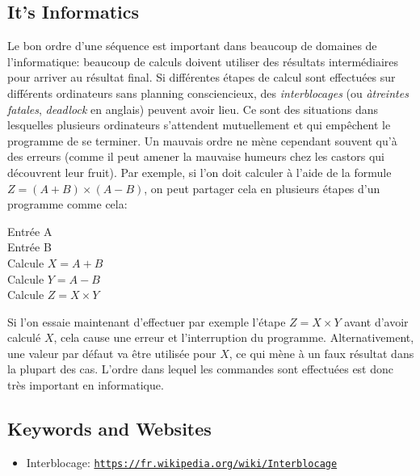 \documentclass[a4paper,11pt]{report}
\makeatletter
\renewenvironment{adjustwidth}[2]{%
    \begin{list}{}{%
    \partopsep\z@%
    \topsep\z@%
    \listparindent\parindent%
    \parsep\parskip%
    \@ifmtarg{#1}{\setlength{\leftmargin}{\z@}}%
                 {\setlength{\leftmargin}{#1}}%
    \@ifmtarg{#2}{\setlength{\rightmargin}{\z@}}%
                 {\setlength{\rightmargin}{#2}}%
    }
    \item[]}{\end{list}}
\newcommand{\BrochureUrlText}[1]{\texttt{#1}}
\makeatother
\begin{document}
\subsection*{It’s Informatics}

Le bon ordre d’une séquence est important dans beaucoup de domaines de l’informatique: beaucoup de calculs doivent utiliser des résultats intermédiaires pour arriver au résultat final. Si différentes étapes de calcul sont effectuées sur différents ordinateurs sans planning consciencieux, des \emph{interblocages} (ou \emph{àtreintes fatales}, \emph{deadlock} en anglais) peuvent avoir lieu. Ce sont des situations dans lesquelles plusieurs ordinateurs s’attendent mutuellement et qui empêchent le programme de se terminer.
Un mauvais ordre ne mène cependant souvent qu’à des erreurs (comme il peut amener la mauvaise humeurs chez les castors qui découvrent leur fruit). Par exemple, si l’on doit calculer à l’aide de la formule ${Z = (A+B) \times (A-B)}$, on peut partager cela en plusieurs étapes d’un programme comme cela:

\begin{adjustwidth}{1.5em}{0em}
Entrée A  \\
Entrée B  \\
Calcule ${X = A + B}$  \\
Calcule ${Y = A - B}$  \\
Calcule ${Z = X \times Y}$
\end{adjustwidth}

Si l’on essaie maintenant d’effectuer par exemple l’étape ${Z = X \times Y}$ avant d’avoir calculé ${X}$, cela cause une erreur et l’interruption du programme. Alternativement, une valeur par défaut va être utilisée pour ${X}$, ce qui mène à un faux résultat dans la plupart des cas. L’ordre dans lequel les commandes sont effectuées est donc très important en informatique.

{\raggedright

\subsection*{Keywords and Websites}

\begin{itemize}
  \item Interblocage: \href{https://fr.wikipedia.org/wiki/Interblocage}{\BrochureUrlText{https://fr.wikipedia.org/wiki/Interblocage}}
\end{itemize}


}
\end{document}
